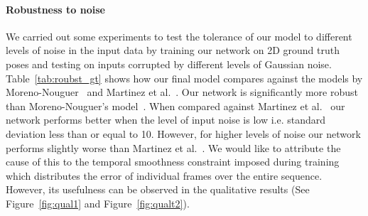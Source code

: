 \documentclass[runningheads]{llncs}
\begin{document}
\paragraph{Robustness to noise}
We carried out some experiments to test the tolerance of our model to different levels of noise in the input data by training our network on 2D ground truth poses and testing on inputs corrupted by different levels of Gaussian noise. Table~\ref{tab:roubst_gt} shows how our final model compares against the models by  Moreno-Nouguer~\cite{distance-matrix} and Martinez et al.~\cite{JMartinez:ICCV:2017}. Our network is significantly more robust than Moreno-Nouguer's model~\cite{distance-matrix}. When compared against Martinez et al.~\cite{JMartinez:ICCV:2017} our network performs better when the level of input noise is low i.e. standard deviation less than or equal to 10. However, for higher levels of noise our network performs slightly worse than Martinez  et al.~\cite{JMartinez:ICCV:2017}. We would like to attribute the cause of this to the temporal smoothness constraint imposed during training which distributes the error of individual frames over the entire sequence. However, its usefulness can be observed in the qualitative results (See Figure~\ref{fig:qual1} and Figure~\ref{fig:qualt2}).
\begin{table}
\centering
{}
\vspace{1.5mm}
\caption{Ablative and hyperparameter sensitivity analysis.}
\vspace{-5mm}
\label{tab:ablative_final}
\end{table}
\end{document}
